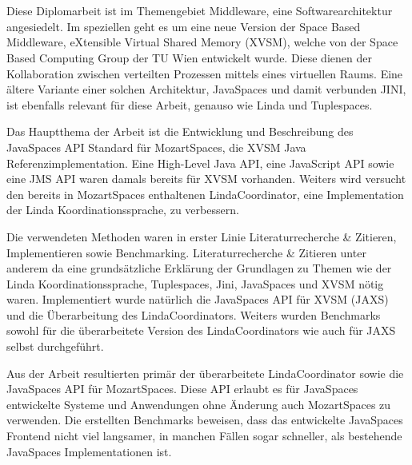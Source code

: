 
%
\section*{\thesisheading} %


Diese Diplomarbeit ist im Themengebiet Middleware, eine Softwarearchitektur angesiedelt. Im speziellen geht es um eine neue Version der Space Based Middleware, eXtensible Virtual Shared Memory (XVSM), welche von der Space Based Computing Group der TU Wien entwickelt wurde. Diese dienen der Kollaboration zwischen verteilten Prozessen mittels eines virtuellen Raums. Eine ältere Variante einer solchen Architektur, JavaSpaces und damit verbunden JINI, ist ebenfalls relevant für diese Arbeit, genauso wie Linda und Tuplespaces.

Das Hauptthema der Arbeit ist die Entwicklung und Beschreibung des JavaSpaces API Standard für MozartSpaces, die XVSM Java Referenzimplementation. Eine High-Level Java API, eine JavaScript API sowie eine JMS API waren damals bereits für XVSM vorhanden. Weiters wird versucht den bereits in MozartSpaces enthaltenen LindaCoordinator, eine Implementation der Linda Koordinationssprache, zu verbessern.
 
Die verwendeten Methoden waren in erster Linie Literaturrecherche \& Zitieren, Implementieren sowie Benchmarking. Literaturrecherche \& Zitieren unter anderem da eine grundsätzliche Erklärung der Grundlagen zu Themen wie der Linda Koordinationssprache, Tuplespaces, Jini, JavaSpaces und XVSM nötig waren. Implementiert wurde natürlich die JavaSpaces API für XVSM (JAXS) und die Überarbeitung des LindaCoordinators. Weiters wurden Benchmarks sowohl für die überarbeitete Version des LindaCoordinators wie auch für JAXS selbst durchgeführt.

Aus der Arbeit resultierten primär der überarbeitete LindaCoordinator sowie die JavaSpaces API für MozartSpaces. Diese API erlaubt es für JavaSpaces entwickelte Systeme und Anwendungen ohne Änderung auch MozartSpaces zu verwenden. Die erstellten Benchmarks beweisen, dass das entwickelte JavaSpaces Frontend nicht viel langsamer, in manchen Fällen sogar schneller, als bestehende JavaSpaces Implementationen ist.

